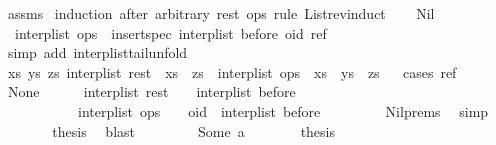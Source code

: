 \begin{isabellebody}
\ assms\ \isamarkupfalse%
{\isacharparenleft}induction\ after\ arbitrary{\isacharcolon}\ rest\ ops\ rule{\isacharcolon}\ List{\isachardot}rev{\isacharunderscore}induct{\isacharparenright}\isanewline
\ \ \isamarkupfalse%
\ Nil\isanewline
\ \ \isamarkupfalse%
\ \isamarkupfalse%
\ {}{\isacharcolon}\ {\isachardoublequoteopen}interp{\isacharunderscore}list\ ops\ {\isacharequal}\ insert{\isacharunderscore}spec\ {\isacharparenleft}interp{\isacharunderscore}list\ before{\isacharparenright}\ {\isacharparenleft}oid{\isacharcomma}\ ref{\isacharparenright}{\isachardoublequoteclose}\isanewline
\ \ \ \ \isamarkupfalse%
\ {\isacharparenleft}simp\ add{\isacharcolon}\ interp{\isacharunderscore}list{\isacharunderscore}tail{\isacharunderscore}unfold{\isacharparenright}\isanewline
\ \ \isamarkupfalse%
\ \isamarkupfalse%
\ {\isachardoublequoteopen}{\isasymexists}xs\ ys\ zs{\isachardot}\ interp{\isacharunderscore}list\ rest\ {\isacharequal}\ xs\ {\isacharat}\ zs\ {\isasymand}\ interp{\isacharunderscore}list\ ops\ {\isacharequal}\ xs\ {\isacharat}\ ys\ {\isacharat}\ zs{\isachardoublequoteclose}\isanewline
\ \ \isamarkupfalse%
{\isacharparenleft}cases\ ref{\isacharparenright}\isanewline
\ \ \ \ \isamarkupfalse%
\ None\isanewline
\ \ \ \ \isamarkupfalse%
\ {\isachardoublequoteopen}interp{\isacharunderscore}list\ rest\ {\isacharequal}\ {\isacharbrackleft}{\isacharbrackright}\ {\isacharat}\ {\isacharparenleft}interp{\isacharunderscore}list\ before{\isacharparenright}\ {\isasymand}\isanewline
\ \ \ \ \ \ \ \ \ \ \ interp{\isacharunderscore}list\ ops\ {\isacharequal}\ {\isacharbrackleft}{\isacharbrackright}\ {\isacharat}\ {\isacharbrackleft}oid{\isacharbrackright}\ {\isacharat}\ {\isacharparenleft}interp{\isacharunderscore}list\ before{\isacharparenright}{\isachardoublequoteclose}\isanewline
\ \ \ \ \ \ \isamarkupfalse%
\ {}\ Nil{\isachardot}prems{\isacharparenleft}{}{\isacharparenright}\ \isamarkupfalse%
\ simp\isanewline
\ \ \ \ \isamarkupfalse%
\ \isamarkupfalse%
\ {\isacharquery}thesis\ \isamarkupfalse%
\ blast\isanewline
\ \ \isamarkupfalse%
\isanewline
\ \ \ \ \isamarkupfalse%
\ {\isacharparenleft}Some\ a{\isacharparenright}\isanewline
\ \ \ \ \isamarkupfalse%
\ \isamarkupfalse%
\ {\isacharquery}thesis\isanewline
\ \ \ \ \isamarkupfalse%

\end{isabellebody}
